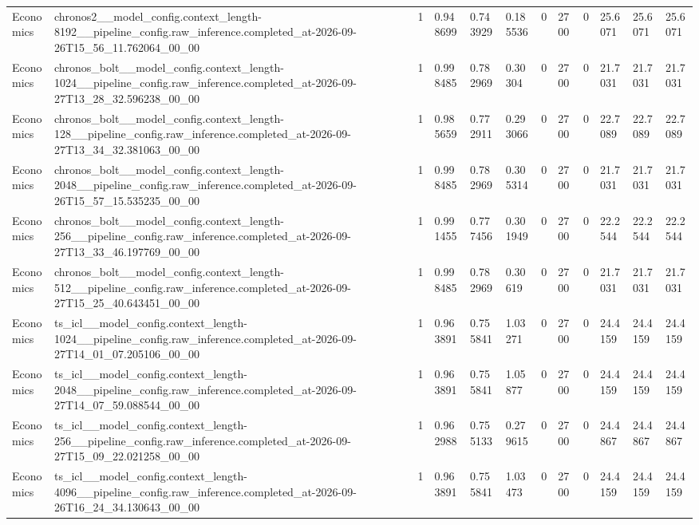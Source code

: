 \begin{tabular}{llllllllllll}
Economics & chronos2\_\_model\_config.context\_length-8192\_\_pipeline\_config.raw\_inference.completed\_at-2026-09-26T15\_56\_11.762064\_00\_00 & 1 & 0.948699 & 0.743929 & 0.185536 & 0 & 2700 & 0 & 25.6071 & 25.6071 & 25.6071 \\
Economics & chronos\_bolt\_\_model\_config.context\_length-1024\_\_pipeline\_config.raw\_inference.completed\_at-2026-09-27T13\_28\_32.596238\_00\_00 & 1 & 0.998485 & 0.782969 & 0.30304 & 0 & 2700 & 0 & 21.7031 & 21.7031 & 21.7031 \\
Economics & chronos\_bolt\_\_model\_config.context\_length-128\_\_pipeline\_config.raw\_inference.completed\_at-2026-09-27T13\_34\_32.381063\_00\_00 & 1 & 0.985659 & 0.772911 & 0.293066 & 0 & 2700 & 0 & 22.7089 & 22.7089 & 22.7089 \\
Economics & chronos\_bolt\_\_model\_config.context\_length-2048\_\_pipeline\_config.raw\_inference.completed\_at-2026-09-26T15\_57\_15.535235\_00\_00 & 1 & 0.998485 & 0.782969 & 0.305314 & 0 & 2700 & 0 & 21.7031 & 21.7031 & 21.7031 \\
Economics & chronos\_bolt\_\_model\_config.context\_length-256\_\_pipeline\_config.raw\_inference.completed\_at-2026-09-27T13\_33\_46.197769\_00\_00 & 1 & 0.991455 & 0.777456 & 0.301949 & 0 & 2700 & 0 & 22.2544 & 22.2544 & 22.2544 \\
Economics & chronos\_bolt\_\_model\_config.context\_length-512\_\_pipeline\_config.raw\_inference.completed\_at-2026-09-27T15\_25\_40.643451\_00\_00 & 1 & 0.998485 & 0.782969 & 0.30619 & 0 & 2700 & 0 & 21.7031 & 21.7031 & 21.7031 \\
Economics & ts\_icl\_\_model\_config.context\_length-1024\_\_pipeline\_config.raw\_inference.completed\_at-2026-09-27T14\_01\_07.205106\_00\_00 & 1 & 0.963891 & 0.755841 & 1.03271 & 0 & 2700 & 0 & 24.4159 & 24.4159 & 24.4159 \\
Economics & ts\_icl\_\_model\_config.context\_length-2048\_\_pipeline\_config.raw\_inference.completed\_at-2026-09-27T14\_07\_59.088544\_00\_00 & 1 & 0.963891 & 0.755841 & 1.05877 & 0 & 2700 & 0 & 24.4159 & 24.4159 & 24.4159 \\
Economics & ts\_icl\_\_model\_config.context\_length-256\_\_pipeline\_config.raw\_inference.completed\_at-2026-09-27T15\_09\_22.021258\_00\_00 & 1 & 0.962988 & 0.755133 & 0.279615 & 0 & 2700 & 0 & 24.4867 & 24.4867 & 24.4867 \\
Economics & ts\_icl\_\_model\_config.context\_length-4096\_\_pipeline\_config.raw\_inference.completed\_at-2026-09-26T16\_24\_34.130643\_00\_00 & 1 & 0.963891 & 0.755841 & 1.03473 & 0 & 2700 & 0 & 24.4159 & 24.4159 & 24.4159 \\

\end{tabular}
